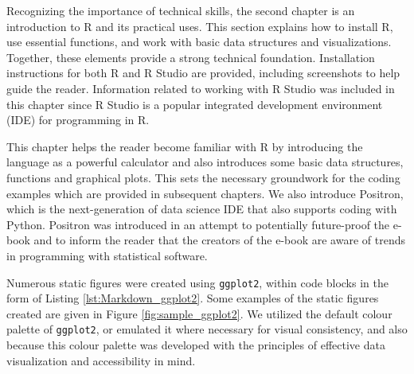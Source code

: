 \documentclass[11pt]{article}
\begin{document}
Recognizing the importance of technical skills, the second chapter is an introduction to R and its practical uses. 
This section explains how to install R, use essential functions, and work with basic data structures and visualizations. 
Together, these elements provide a strong technical foundation. 
Installation instructions for both R and R Studio are provided, including screenshots to help guide the reader.
Information related to working with R Studio was included in this chapter since R Studio is a popular integrated development environment (IDE) for programming in R.

This chapter helps the reader become familiar with R by introducing the language as a powerful calculator and also introduces some basic data structures, functions and graphical plots.
This sets the necessary groundwork for the coding examples which are provided in subsequent chapters.
We also introduce Positron, which is the next-generation of data science IDE that also supports coding with Python.
Positron was introduced in an attempt to potentially future-proof the e-book and to inform the reader that the creators of the e-book are aware of trends in programming with statistical software.

Numerous static figures were created using \texttt{ggplot2}, within code blocks in the form of Listing \ref{lst:Markdown_ggplot2}.
Some examples of the static figures created are given in Figure \ref{fig:sample_ggplot2}.
We utilized the default colour palette of \texttt{ggplot2}, or emulated it where necessary for visual consistency,
and also because this colour palette was developed with the principles of effective data visualization and accessibility in mind.

\end{document}

